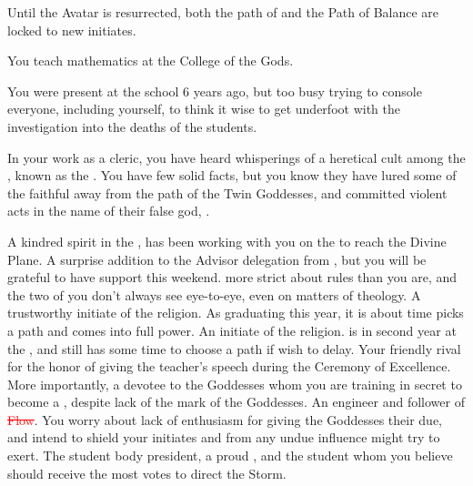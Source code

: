 \documentclass[char]{GL2020}
\begin{document}
\begin{itemz}[Notes]
	\item Until the \cEbb{} Avatar is resurrected, both the path of \cEbb{} and the Path of Balance are locked to new initiates.
	\item You teach mathematics at the College of the Gods.
	\item You were present at the school 6 years ago, but too busy trying to console everyone, including yourself, to think it wise to get underfoot with the investigation into the deaths of the students. 
	\item In your work as a cleric, you have heard whisperings of a heretical cult among the \pShip{}, known as the \pGoaties{}. You have few solid facts, but you know they have lured some of the faithful away from the path of the Twin Goddesses, and committed violent acts in the name of their false god, \cGenesis{}.
\end{itemz}

\begin{contacts}
	\contact{\cCurse{}} A kindred spirit in the \pFarm{}, \cCurse{} has been working with you on the \iBeansMB{} to reach the Divine Plane.
\contact{\cEbbPriest{}} A surprise addition to the Advisor delegation from \pShip{}, but you will be grateful to have \cEbbPriest{\their} support this weekend. \cEbbPriest{\Theyare} more strict about rules than you are, and the two of you don't always see eye-to-eye, even on matters of theology.
	\contact{\cInitiate{}} A trustworthy initiate of the \pShippies{} religion. As \cInitiate{\theyare} graduating this year, it is about time \cInitiate{} picks a path and comes into \cInitiate{\their} full power.
\contact{\cWarlordDaughter{}} An initiate of the \pShippies{} religion. \cWarlordDaughter{} is in \cWarlordDaughter{\their} second year at the \pSc{}, and still has some time to choose a path if \cWarlordDaughter{\they} wish\cWarlordDaughter{\pluralC} to delay.
\contact{\cPirate{}} Your friendly rival for the honor of giving the teacher's speech during the Ceremony of Excellence. More importantly, a devotee to the \pShip{} Goddesses whom you are training in secret to become a \cPirate{\cleric}, despite \cPirate{\their} lack of the mark of the Goddesses.
	\contact{\cBunker{}} An engineer and follower of \textcolor{red}{\cEbb{} \sout{Flow}}. You worry about \cBunker{\their} lack of enthusiasm for giving the Goddesses their due, and intend to shield your initiates \cInitiate{} and \cWarlordDaughter{} from any undue influence \cBunker{\they} might try to exert.
	\contact{\cPresident{}} The student body president, a proud \pShip{}, and the student whom you believe should receive the most votes to direct the Storm.
\end{contacts}
\end{document}
